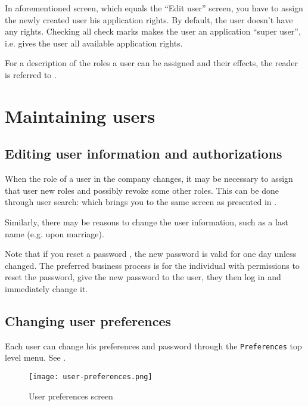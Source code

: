In aforementioned screen, which equals the ``Edit user'' screen, you have to assign the
newly created user his application rights. By default, the user doesn't have any
rights. Checking all check marks makes the user an application ``super user'', i.e.
gives the user all available application rights.

For a description of the roles a user can be assigned and their effects, the
reader is referred to .


\section{Maintaining users}
\label{sec-user-management-maintenance}

\subsection{Editing user information and authorizations}
\label{subsec-user-maintenance-editing-authorizations}

When the role of a user in the company changes, it may be necessary to assign
that user new roles and possibly revoke some other roles. This can be done through
user search:  which brings you to the same screen as presented in
.

Similarly, there may be reasons to change the user information, such as a last name
(e.g. upon marriage).

Note that if you reset a password , the new password is valid for one day unless
changed.  The preferred business process is for the individual with permissions to reset
the password, give the new password to the user, they then log in and
immediately change it.

\subsection{Changing user preferences}
\label{subsec-user-management-user-prefs}

Each user can change his preferences  and password  through the \texttt{Preferences}
top level menu. See .

\begin{figure}[h]
\centering
\texttt{[image: user-preferences.png]}
\caption{User preferences screen}
\label{fig:user-preferences}
\end{figure}



